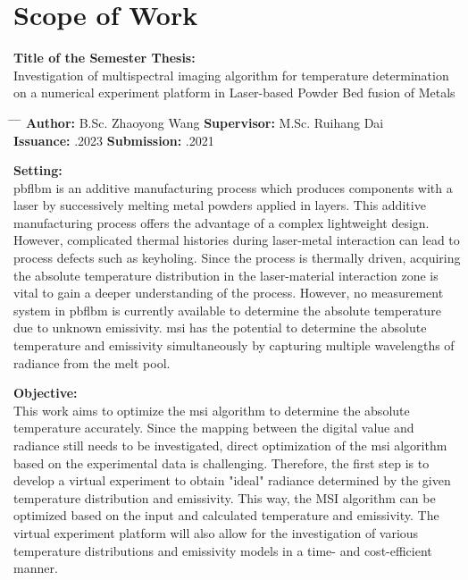 \chapter*{Scope of Work}



\textbf{Title of the Semester Thesis:}\\
\Large{Investigation of multispectral imaging algorithm for temperature
determination on a numerical experiment platform in Laser-based 
Powder Bed fusion of Metals}\\
\normalsize

\begin{tabbing}
	\hspace{7em} 		\= \hspace{13em}			\= \hspace{7em} 		\= \kill
	\textbf{Author:}  \> B.Sc. Zhaoyong Wang 	\> \textbf{Supervisor:} 	\>  M.Sc. Ruihang Dai \\
	\textbf{Issuance:} 	.2023 	\> \textbf{Submission:} 	.2021
\end{tabbing}

\textbf{Setting:}\\
\gls{pbflbm} is an additive manufacturing
process which produces components with a laser by successively melting metal
powders applied in layers. This additive manufacturing process offers the advantage
of a complex lightweight design. However, complicated thermal histories
during laser-metal interaction can lead to process defects such as keyholing. Since
the process is thermally driven, acquiring the absolute temperature distribution in
the laser-material interaction zone is vital to gain a deeper understanding of the
process. However, no measurement system in \gls{pbflbm} is currently available to
determine the absolute temperature due to unknown emissivity. \gls{msi} has the 
potential to determine the absolute temperature and emissivity
simultaneously by capturing multiple wavelengths of radiance from the melt pool.


\textbf{Objective:}\\
This work aims to optimize the \gls{msi} algorithm to determine the absolute temperature
accurately. Since the mapping between the digital value and radiance still
needs to be investigated, direct optimization of the \gls{msi} algorithm based on the experimental
data is challenging. Therefore, the first step is to develop a virtual experiment
to obtain "ideal" radiance determined by the given temperature distribution
and emissivity. This way, the MSI algorithm can be optimized based on the input
and calculated temperature and emissivity. The virtual experiment platform will also
allow for the investigation of various temperature distributions and emissivity models
in a time- and cost-efficient manner.%


